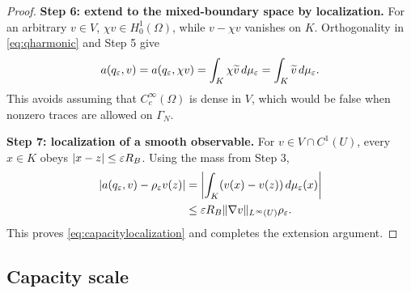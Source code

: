\begin{proof}
\textbf{Step 6: extend to the mixed-boundary space by localization.}
For an arbitrary $v\in V$, $\chi v\in H^1_0(\Omega)$, while
$v-\chi v$ vanishes on $K$. Orthogonality in \cref{eq:qharmonic} and Step 5 give
\[
 a(q_\varepsilon,v)=a(q_\varepsilon,\chi v)
 =\int_K\chi\widetilde v\,d\mu_\varepsilon
 =\int_K\widetilde v\,d\mu_\varepsilon.
\]
This avoids assuming that $C_c^\infty(\Omega)$ is dense in $V$, which would
be false when nonzero traces are allowed on $\Gamma_N$.

\textbf{Step 7: localization of a smooth observable.}
For $v\in V\cap C^1(U)$, every $x\in K$ obeys $|x-z|\le\varepsilon R_B$.
Using the mass from Step 3,
\begin{align}
 |a(q_\varepsilon,v)-\rho_\varepsilon v(z)|
 &=\left|\int_K(v(x)-v(z))\,d\mu_\varepsilon(x)\right|\\
 &\le\varepsilon R_B\|\nabla v\|_{L^\infty(U)}\rho_\varepsilon.
\end{align}
This proves \cref{eq:capacitylocalization} and completes the extension argument.
\end{proof}

\subsection{Capacity scale}

